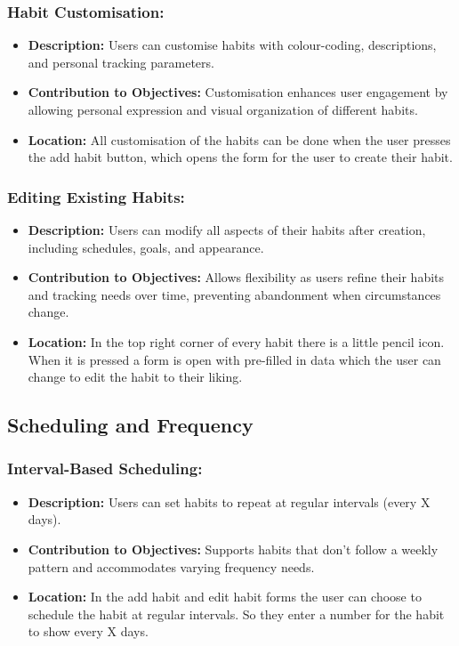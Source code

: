\subsubsection{Habit Customisation:}
\begin{itemize}
    \item \textbf{Description:} Users can customise habits with colour-coding, descriptions, and personal tracking parameters.
    \item \textbf{Contribution to Objectives:} Customisation enhances user engagement by allowing personal expression and visual organization of different habits.
    \item \textbf{Location:} All customisation of the habits can be done when the user presses the add habit button, which opens the form for the user to create their habit.
\end{itemize}

\subsubsection{Editing Existing Habits:}
\begin{itemize}
    \item \textbf{Description:} Users can modify all aspects of their habits after creation, including schedules, goals, and appearance.
    \item \textbf{Contribution to Objectives:} Allows flexibility as users refine their habits and tracking needs over time, preventing abandonment when circumstances change.
    \item \textbf{Location:} In the top right corner of every habit there is a little pencil icon. When it is pressed a form is open with pre-filled in data which the user can change to edit the habit to their liking.
\end{itemize}

\subsection{Scheduling and Frequency}
\subsubsection{Interval-Based Scheduling:}
\begin{itemize}
    \item \textbf{Description:} Users can set habits to repeat at regular intervals (every X days).
    \item \textbf{Contribution to Objectives:} Supports habits that don't follow a weekly pattern and accommodates varying frequency needs.
    \item \textbf{Location:} In the add habit and edit habit forms the user can choose to schedule the habit at regular intervals. So they enter a number for the habit to show every X days.
\end{itemize}

